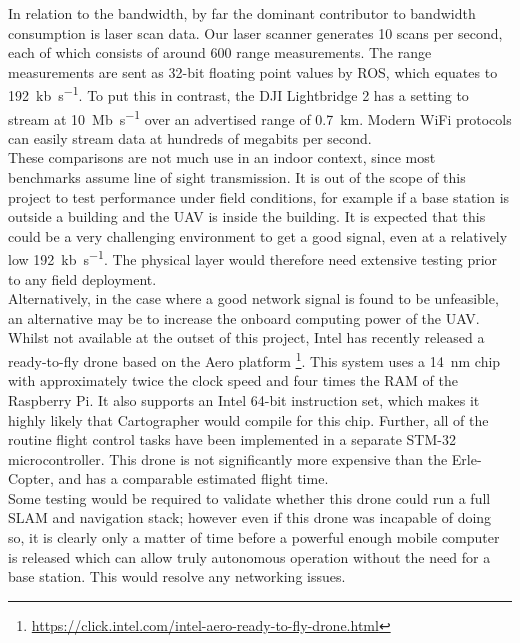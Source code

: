 \documentclass[capstone_report.tex]{subfiles}
\begin{document}
In relation to the bandwidth, by far the dominant contributor to bandwidth consumption is laser scan data. Our laser scanner generates 10 scans per second, each of which consists of around 600 range measurements. The range measurements are sent as 32-bit floating point values by ROS, which equates to \SI{192}{\kilo b\per\second}. To put this in contrast, the DJI Lightbridge 2 has a setting to stream at \SI{10}{\mega b\per\second} over an advertised range of \SI{0.7}{\kilo\meter}. Modern WiFi protocols can easily stream data at hundreds of megabits per second.\\

These comparisons are not much use in an indoor context, since most benchmarks assume line of sight transmission. It is out of the scope of this project to test performance under field conditions, for example if a base station is outside a building and the UAV is inside the building. It is expected that this could be a very challenging environment to get a good signal, even at a relatively low \SI{192}{\kilo b\per\second}. The physical layer would therefore need extensive testing prior to any field deployment. \\

Alternatively, in the case where a good network signal is found to be unfeasible, an alternative may be to increase the onboard computing power of the UAV. Whilst not available at the outset of this project, Intel has recently released a ready-to-fly drone based on the Aero platform \footnote{\url{https://click.intel.com/intel-aero-ready-to-fly-drone.html}}. This system uses a \SI{14}{\nano\meter} chip with approximately twice the clock speed and four times the RAM of the Raspberry Pi. It also supports an Intel 64-bit instruction set, which makes it highly likely that Cartographer would compile for this chip. Further, all of the routine flight control tasks have been implemented in a separate STM-32 microcontroller. This drone is not significantly more expensive than the Erle-Copter, and has a comparable estimated flight time.\\

Some testing would be required to validate whether this drone could run a full SLAM and navigation stack; however even if this drone was incapable of doing so, it is clearly only a matter of time before a powerful enough mobile computer is released which can allow truly autonomous operation without the need for a base station. This would resolve any networking issues. \\
\end{document}
